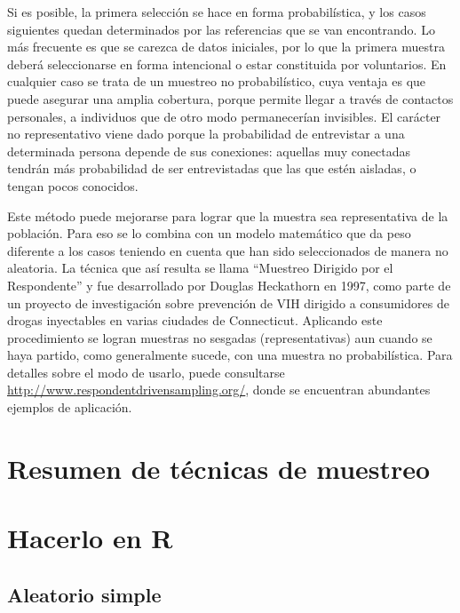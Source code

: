 \documentclass[]{book}
\begin{document}
Si es posible, la primera selección se hace en forma probabilística, y
los casos siguientes quedan determinados por las referencias que se van
encontrando. Lo más frecuente es que se carezca de datos iniciales, por
lo que la primera muestra deberá seleccionarse en forma intencional o
estar constituida por voluntarios. En cualquier caso se trata de un
muestreo no probabilístico, cuya ventaja es que puede asegurar una
amplia cobertura, porque permite llegar a través de contactos
personales, a individuos que de otro modo permanecerían invisibles. El
carácter no representativo viene dado porque la probabilidad de
entrevistar a una determinada persona depende de sus conexiones:
aquellas muy conectadas tendrán más probabilidad de ser entrevistadas
que las que estén aisladas, o tengan pocos conocidos.

Este método puede mejorarse para lograr que la muestra sea
representativa de la población. Para eso se lo combina con un modelo
matemático que da peso diferente a los casos teniendo en cuenta que han
sido seleccionados de manera no aleatoria. La técnica que así resulta se
llama ``Muestreo Dirigido por el Respondente'' y fue desarrollado por
Douglas Heckathorn en 1997, como parte de un proyecto de investigación
sobre prevención de VIH dirigido a consumidores de drogas inyectables en
varias ciudades de Connecticut. Aplicando este procedimiento se logran
muestras no sesgadas (representativas) aun cuando se haya partido, como
generalmente sucede, con una muestra no probabilística. Para detalles
sobre el modo de usarlo, puede consultarse
\url{http://www.respondentdrivensampling.org/}, donde se encuentran abundantes
ejemplos de aplicación.

\hypertarget{resumen-de-tuxe9cnicas-de-muestreo}{%
\section{Resumen de técnicas de muestreo}\label{resumen-de-tuxe9cnicas-de-muestreo}}

\hypertarget{hacerlo-en-r-4}{%
\section{Hacerlo en R}\label{hacerlo-en-r-4}}

\hypertarget{aleatorio-simple}{%
\subsection{Aleatorio simple}\label{aleatorio-simple}}
\end{document}
